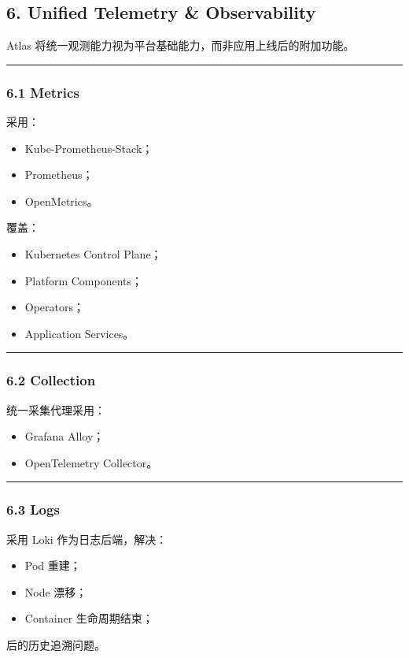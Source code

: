 \documentclass[11pt,a4paper]{article}
\begin{document}
\subsection{6. Unified Telemetry \& Observability}
Atlas 将统一观测能力视为平台基础能力，而非应用上线后的附加功能。

\vspace{0.5em}\hrule\vspace{0.5em}
\subsubsection{6.1 Metrics}
采用：

\begin{itemize}
  \item Kube-Prometheus-Stack；
  \item Prometheus；
  \item OpenMetrics。
\end{itemize}
覆盖：

\begin{itemize}
  \item Kubernetes Control Plane；
  \item Platform Components；
  \item Operators；
  \item Application Services。
\end{itemize}
\vspace{0.5em}\hrule\vspace{0.5em}
\subsubsection{6.2 Collection}
统一采集代理采用：

\begin{itemize}
  \item Grafana Alloy；
  \item OpenTelemetry Collector。
\end{itemize}
\vspace{0.5em}\hrule\vspace{0.5em}
\subsubsection{6.3 Logs}
采用 Loki 作为日志后端，解决：

\begin{itemize}
  \item Pod 重建；
  \item Node 漂移；
  \item Container 生命周期结束；
\end{itemize}
后的历史追溯问题。
\end{document}
